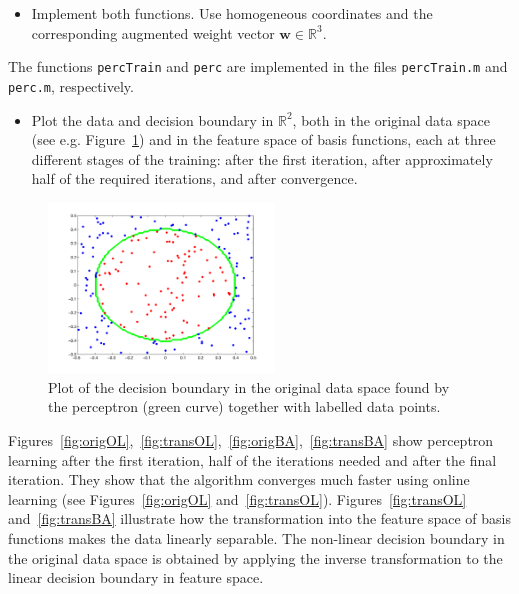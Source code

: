 \documentclass[a4]{article}
\begin{document}
\begin{itemize}
\item Implement both functions. Use homogeneous coordinates and the corresponding augmented weight vector ${\mathbf w}\in\mathbb{R}^3$.
\end{itemize}
The functions \texttt{percTrain} and \texttt{perc} are implemented in the files \texttt{percTrain.m} and \texttt{perc.m}, respectively.
\begin{itemize}
	\item Plot the data and decision boundary in $\mathbb{R}^2$, both in the original data space (see e.g. Figure~\ref{fig:perceptron}) and in the feature space of basis functions, each at three different stages of the training: after the first iteration, after approximately half of the required iterations, and after convergence.
\end{itemize}
\begin{figure}[!h]
	\begin{center}
		\centering
		\includegraphics[width=6cm]{../figures/perceptron.pdf}
	\end{center}
	\caption{\label{fig:perceptron}Plot of the decision boundary in the original data space found by the perceptron (green curve) together with labelled data points.}
\end{figure}
Figures~\ref{fig:origOL},~\ref{fig:transOL},~\ref{fig:origBA},~\ref{fig:transBA} show perceptron learning after the first iteration, half of the iterations needed and after the final iteration. They show that the algorithm converges much faster using online learning (see Figures~\ref{fig:origOL} and~\ref{fig:transOL}). Figures~\ref{fig:transOL} and~\ref{fig:transBA} illustrate how the transformation into the feature space of basis functions makes the data linearly separable. The non-linear decision boundary in the original data space is obtained by applying the inverse transformation to the linear decision boundary in feature space.
\end{document}
